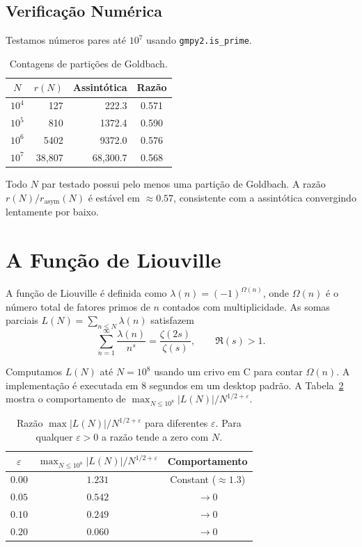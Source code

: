 \documentclass[12pt,a4paper]{article}
\theoremstyle{plain}
\begin{document}
\subsection{Verificação Numérica}

Testamos números pares até $10^7$ usando {\tt gmpy2.is\_prime}.

\begin{table}[htbp]
\centering
\caption{Contagens de partições de Goldbach.}
\label{tab:goldbach}
\begin{tabular}{crrc}
\hline
$N$ & $r(N)$ & Assintótica & Razão \\
\hline
$10^4$ & 127 & 222.3 & 0.571 \\
$10^5$ & 810 & 1372.4 & 0.590 \\
$10^6$ & 5402 & 9372.0 & 0.576 \\
$10^7$ & 38,807 & 68,300.7 & 0.568 \\
\hline
\end{tabular}
\end{table}

Todo $N$ par testado possui pelo menos uma partição de Goldbach.
A razão $r(N)/r_{\text{asym}}(N)$ é estável em $\approx0.57$,
consistente com a assintótica convergindo lentamente por baixo.

\section{A Função de Liouville}
\label{sec:liouville}

A função de Liouville é definida como $\lambda(n)=(-1)^{\Omega(n)}$,
onde $\Omega(n)$ é o número total de fatores primos de $n$
contados com multiplicidade.  As somas parciais
$L(N)=\sum_{n\le N}\lambda(n)$ satisfazem
\[
\sum_{n=1}^{\infty}\frac{\lambda(n)}{n^{s}} = \frac{\zeta(2s)}{\zeta(s)},\qquad
\Re(s)>1.
\]

Computamos $L(N)$ até $N=10^{8}$ usando um crivo em C para contar
$\Omega(n)$.  A implementação é executada em 8 segundos em um desktop
padrão.  A Tabela~\ref{tab:liouville_cota} mostra o comportamento de
$\max_{N\le10^{8}}|L(N)|/N^{1/2+\varepsilon}$.

\begin{table}[htbp]
\centering
\begin{tabular}{c c c}
\hline
$\varepsilon$ & $\max_{N\le10^{8}}|L(N)|/N^{1/2+\varepsilon}$ & Comportamento \\
\hline
$0.00$ & $1.231$ & Constant ($\approx1.3$) \\
$0.05$ & $0.542$ & $\to0$ \\
$0.10$ & $0.249$ & $\to0$ \\
$0.20$ & $0.060$ & $\to0$ \\
\hline
\end{tabular}
\caption{Razão $\max|L(N)|/N^{1/2+\varepsilon}$ para diferentes $\varepsilon$.
Para qualquer $\varepsilon>0$ a razão tende a zero com $N$.}
\label{tab:liouville_cota}
\end{table}
\end{document}
